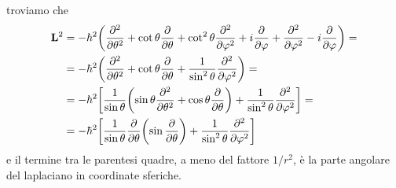 troviamo che
\begin{equation}
	\begin{split}
		\vec L^2&=-\hbar^2\bigg(\ddrp{}{\theta}+\cot\theta\drp{}{\theta}+\cot^2\theta\ddrp{}{\phi}+i\drp{}{\phi}+\ddrp{}{\phi}-i\drp{}{\phi}\bigg)=\\
		&=-\hbar^2\bigg(\ddrp{}{\theta}+\cot\theta\drp{}{\theta}+\frac1{\sin^2\theta}\ddrp{}{\phi}\bigg)=\\
		&=-\hbar^2\bigg[\frac1{\sin\theta}\bigg(\!\sin\theta\ddrp{}{\theta}+\cos\theta\drp{}{\theta}\bigg)+\frac1{\sin^2\theta}\ddrp{}{\phi}\bigg]=\\
		&=-\hbar^2\bigg[\frac1{\sin\theta}\drp{}{\theta}\bigg(\!\sin\drp{}{\theta}\bigg)+\frac1{\sin^2\theta}\ddrp{}{\phi}\bigg]
	\end{split}
	\label{eq:L^2-schroedinger}
\end{equation}
e il termine tra le parentesi quadre, a meno del fattore $1/r^2$, è la parte angolare del laplaciano in coordinate sferiche.

